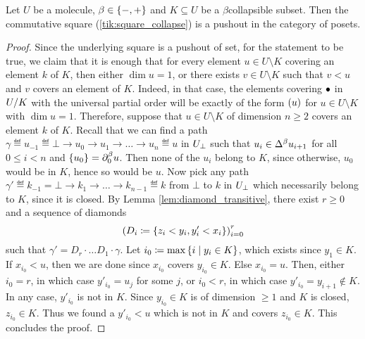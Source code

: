 \begin{lem} \label{lem:collapsible_is_puhsout}
    Let \( U \) be a molecule, \( \beta \in \set{-, +} \) and \( K \subseteq U \) be a \( \beta \)\nbd collapsible subset.
    Then the commutative square (\ref{tik:square_collapse}) is a pushout in the category of posets.
\end{lem}
\begin{proof}
    Since the underlying square is a pushout of set, for the statement to be true, we claim that it is enough that for every element \( u \in U \setminus K \) covering an element \( k \) of \( K \), then either \( \dim u = 1 \), or there exists \( v \in U \setminus K \) such that \( v < u \) and \( v \) covers an element of \( K \).
    Indeed, in that case, the elements covering \( \zcoll \) in \( \coll{K}{U} \) with the universal partial order will be exactly of the form \( \icoll{u} \) for \( u \in U \setminus K \) with \( \dim u = 1 \). 
    Therefore, suppose that \( u \in U \setminus K \) of dimension \( n \geq 2 \) covers an element \( k \) of \( K \).
    Recall that we can find a path \( \gamma \eqdef u_{-1} \eqdef \bot \to u_0 \to u_1 \to \ldots \to u_n \eqdef u \) in \( \augm{U} \) such that \( u_i \in \faces{}{\beta} u_{i + 1} \) for all \( 0 \le i < n \) and \( \set{u_0} = \bd{0}{\beta} u \).
    Then none of the \( u_i \) belong to \( K \), since otherwise, \( u_0 \) would be in \( K \), hence so would be \( u \).
    Now pick any path \( \gamma' \eqdef k_{-1} = \bot \to k_1 \to \ldots \to k_{n - 1} \eqdef k \) from \( \bot \) to \( k \) in \( \augm{U} \) which necessarily belong to \( K \), since it is closed.
    By Lemma \ref{lem:diamond_transitive}, there exist \( r \geq 0 \) and a sequence of diamonds 
    \begin{equation*}
        \left(D_i \eqdef \set{z_i < y_i, y'_i < x_i}\right)_{i = 0}^r
    \end{equation*}
    such that \( \gamma' = D_r \cdot \ldots D_1 \cdot \gamma \).
    Let \( i_0 \eqdef \max \set{i \mid y_i \in K} \), which exists since \( y_1 \in K \).
    If \( x_{i_0} < u \), then we are done since \( x_{i_0} \) covers \( y_{i_0} \in K \).
    Else \( x_{i_0} = u \).
    Then, either \( i_0 = r \), in which case \( y'_{i_0} = u_j \) for some \( j \), or \( i_0 < r \), in which case \( y'_{i_0} = y_{i + 1} \notin K \).
    In any case, \( y'_{i_0} \) is not in \( K \).
    Since \( y_{i_0} \in K \) is of dimension \( \geq 1 \) and \( K \) is closed, \( z_{i_0} \in K \).
    Thus we found a \( y'_{i_0} < u \) which is not in \( K \) and covers \( z_{i_0} \in K \).
    This concludes the proof.
\end{proof}


